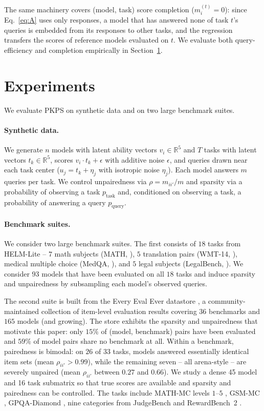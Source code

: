 \documentclass{article}
\theoremstyle{definition}
\theoremstyle{plain}
\newcommand{\PKPS}{PKPS\xspace}
\begin{document}
The same machinery covers (model, task) score completion ($m_i^{(t)}=0$): since
Eq.~\eqref{eq:A} uses only responses, a model that has answered none of task $t$'s
queries is embedded from its responses to other tasks, and the regression transfers
the scores of reference models evaluated on $t$.
We evaluate both query-efficiency and completion empirically in Section~\ref{sec:experiments}.

\section{Experiments}
\label{sec:experiments}
We evaluate \PKPS on synthetic data and on two large benchmark suites.

\paragraph{Synthetic data.} We generate $n$ models with latent ability vectors
$v_i \in \mathbb{R}^{5}$ and $T$ tasks with latent vectors $t_k \in \mathbb{R}^{5}$,
scores $v_i\cdot t_k+\epsilon$ with additive noise $ \epsilon $, and queries drawn near each task center ($u_j = t_k +
\eta_j$ with isotropic noise $\eta_j$).
Each model answers $m$ queries per task.
We control unpairedness via
$\rho=m_{ii'}/m$ and sparsity via a probability of observing a task
$p_{\mathrm{task}}$ and, conditioned on observing a task, a probability of answering
a query $p_{\mathrm{query}}$.

\paragraph{Benchmark suites.}
We consider two large benchmark suites.
The first consists of $18$ tasks from HELM-Lite \citep{helm}
-- $7$ math subjects (MATH, \citealp{hendrycks2021math}), $5$ translation pairs
(WMT-14, \citealp{bojar2014wmt}), medical multiple choice
(MedQA, \citealp{jin2021medqa}), and $5$ legal subjects
(LegalBench, \citealp{guha2023legalbench}).
We consider $93$ models that have been evaluated on all $ 18 $ tasks and induce sparsity and unpairedness by subsampling each model's observed queries.

The second suite is built from the Every Eval Ever datastore \citep{eee2026}, a
community-maintained collection of item-level evaluation results covering $36$ benchmarks and $165$ models (and growing).
The store exhibits the sparsity and unpairedness that motivate this paper:
only $15\%$ of (model, benchmark) pairs have been evaluated and $59\%$ of model
pairs share no benchmark at all.
Within a benchmark, pairedness is bimodal: on $26$ of $33$ tasks,
models answered essentially identical item sets (mean $\rho_{ii'}>0.99$), while the
remaining seven -- all arena-style \citep{chiang2024chatbot} -- are severely
unpaired (mean $\rho_{ii'}$ between $0.27$ and $0.66$).
We study a dense 45 model and 16 task submatrix so that true scores are available and
sparsity and pairedness can be controlled.
The tasks include MATH-MC
levels $1$--$5$ \citep{hendrycks2021math}, GSM-MC \citep{cobbe2021gsm8k},
GPQA-Diamond \citep{rein2023gpqa}, nine categories from JudgeBench
\citep{tan2024judgebench} and RewardBench~2 \citep{malik2025rewardbench2}.
\end{document}
